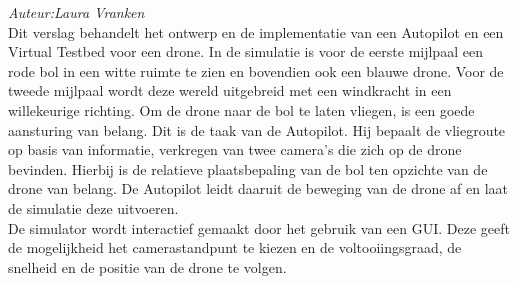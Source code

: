 \noindent
{\em Auteur:Laura Vranken }\\
Dit verslag behandelt het ontwerp en de implementatie van een Autopilot en een Virtual Testbed voor een drone. In de simulatie is voor de eerste mijlpaal een rode bol in een witte ruimte te zien en bovendien ook een blauwe drone. Voor de tweede mijlpaal wordt deze wereld uitgebreid met een windkracht in een willekeurige richting. 
Om de drone naar de bol te laten vliegen, is een goede aansturing van belang. Dit is de taak van de Autopilot. Hij bepaalt de vliegroute op basis van informatie, verkregen van twee camera's die zich op de drone bevinden. Hierbij is de relatieve plaatsbepaling van de bol ten opzichte van de drone van belang. De Autopilot leidt daaruit de beweging van de drone af en laat de simulatie deze uitvoeren.\\
De simulator wordt interactief gemaakt door het gebruik van een GUI. Deze geeft de mogelijkheid het camerastandpunt te kiezen en de voltooiingsgraad, de snelheid en de positie van de drone te volgen.


 

